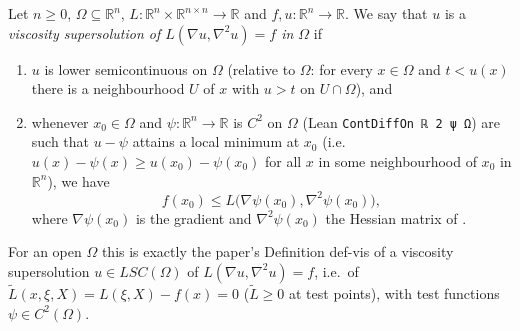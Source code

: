 \begin{definition}[Viscosity supersolution of $L(\nabla u,\nabla^2u)=f$, paper Def.~def-vis]
Let $n\ge0$, $\Omega\subseteq\mathbb R^n$, $L:\mathbb R^n\times\mathbb R^{n\times n}\to\mathbb R$ and $f,u:\mathbb R^n\to\mathbb R$. We say that $u$ is a \emph{viscosity supersolution of $L(\nabla u,\nabla^2u)=f$ in $\Omega$} if
\begin{enumerate}
\item[(i)] $u$ is lower semicontinuous on $\Omega$ (relative to $\Omega$: for every $x\in\Omega$ and $t<u(x)$ there is a neighbourhood $U$ of $x$ with $u>t$ on $U\cap\Omega$), and
\item[(ii)] whenever $x_0\in\Omega$ and $\psi:\mathbb R^n\to\mathbb R$ is $C^2$ on $\Omega$ (Lean \texttt{ContDiffOn ℝ 2 ψ Ω}) are such that $u-\psi$ attains a local minimum at $x_0$ (i.e.\ $u(x)-\psi(x)\ge u(x_0)-\psi(x_0)$ for all $x$ in some neighbourhood of $x_0$ in $\mathbb R^n$), we have
\[
f(x_0)\le L\bigl(\nabla\psi(x_0),\nabla^2\psi(x_0)\bigr),
\]
where $\nabla\psi(x_0)$ is the gradient and $\nabla^2\psi(x_0)$ the Hessian matrix of .
\end{enumerate}
For an open $\Omega$ this is exactly the paper's Definition def-vis of a viscosity supersolution $u\in LSC(\Omega)$ of $L(\nabla u,\nabla^2u)=f$, i.e.\ of $\tilde L(x,\xi,X)=L(\xi,X)-f(x)=0$ ($\tilde L\ge0$ at test points), with test functions $\psi\in C^2(\Omega)$.
\end{definition}
